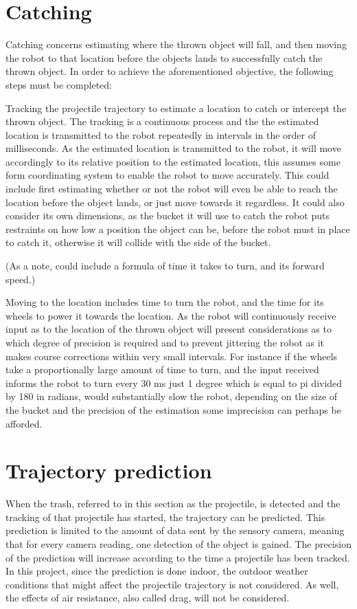 \section{Catching}
\label{sec:catchingTheory}
Catching concerns estimating where the thrown object will fall, and then moving the robot to that location before the objects lands to successfully catch the thrown object. In order to achieve the aforementioned objective, the following steps must be completed:

Tracking the projectile trajectory to estimate a location to catch or intercept the thrown object. The tracking is a continuous process and the the estimated location is transmitted to the robot repeatedly in intervals in the order of milliseconds. As the estimated location is transmitted to the robot, it will move accordingly to its relative position to the estimated location, this assumes some form coordinating system to enable the robot to move accurately. This could include first estimating whether or not the robot will even be able to reach the location before the object lands, or just move towards it regardless. It could also consider its own dimensions, as the bucket it will use to catch the robot puts restraints on how low a position the object can be, before the robot must in place to catch it, otherwise it will collide with the side of the bucket. 

(As a note, could include a formula of time it takes to turn, and its forward speed.)

Moving to the location includes time to turn the robot, and the time for its wheels to power it towards the location. As the robot will continuously receive input as to the location of the thrown object will present considerations as to which degree of precision is required and to prevent jittering the robot as it makes course corrections within very small intervals. For instance if the wheels take a proportionally large amount of time to turn, and the input received informs the robot to turn every 30 ms just 1 degree which is equal to pi divided by 180 in radians, would substantially slow the robot, depending on the size of the bucket and the precision of the estimation some imprecision can perhaps be afforded. 

\section{Trajectory prediction}
\label{sec:Trajectory prediction}
When the trash, referred to in this section as the projectile, is detected and the tracking of that projectile has started, the trajectory can be predicted. This prediction is limited to the amount of data sent by the sensory camera, meaning that for every camera reading, one detection of the object is gained. The precision of the prediction will increase according to the time a projectile has been tracked. \newline 
In this project, since the prediction is done indoor, the outdoor weather conditions that might affect the projectile trajectory is not considered. As well, the effects of air resistance, also called drag, will not be considered.

